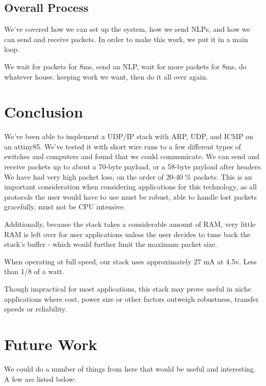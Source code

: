 \documentclass{article}
\begin{document}
\subsection{Overall Process}
We've covered how we can set up the system, how we send NLPs, and how we can send and receive
packets. In order to make this work, we put it in a main loop.

We wait for packets for 8ms, send an NLP, wait for more packets for 8ms, do whatever house.
keeping work we want, then do it all over again.

\section{Conclusion}
We've been able to implement a UDP/IP stack with ARP, UDP, and ICMP on an attiny85.  We've tested it
with short wire runs to a few different types of switches and computers and found that we could communicate.
We can send and receive packets up to about a 70-byte payload, or a 58-byte payload after headers.
We have had very high packet loss, on the order of 20-40 \% packets.  This is an important consideration
when considering applications for this technology, as all protocols the user would have to use must be
robust, able to handle lost packets gracefully, must not be CPU intensive.

Additionally, because the stack takes a considerable amount of RAM, very little RAM is left over for user
applications unless the user decides to tune back the stack's buffer - which would further limit the 
maximum packet size.

When operating at full speed, our stack uses approximately 27 mA at 4.5v.  Less than 1/8 of a watt.

Though impractical for most applications, this stack may prove useful in niche applications where 
cost, power size or other factors outweigh robustness, transfer speeds or reliability.

\section{Future Work}
We could do a number of things from here that would be useful and interesting.  A few are listed below:
\end{document}
